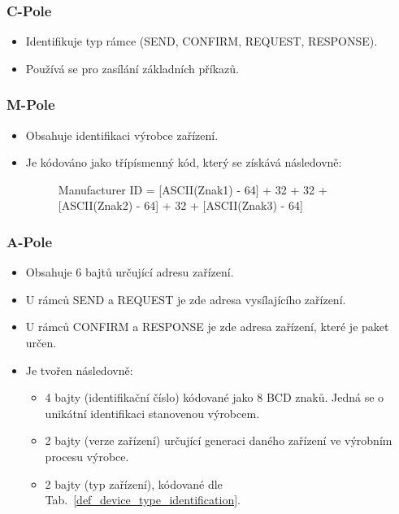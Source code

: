 \subsubsection{C-Pole}
\begin{itemize}
	\item Identifikuje typ rámce (SEND, CONFIRM, REQUEST, RESPONSE).
	\item Používá se pro zasílání základních příkazů.
\end{itemize}

\newpage

\subsubsection{M-Pole}
\begin{itemize}
	\item Obsahuje identifikaci výrobce zařízení.
	\item Je kódováno jako třípísmenný kód, který se získává následovně:
			\begin{figure}[!ht]
				\begin{centerverbatim}
				Manufacturer ID = [ASCII(Znak1) - 64] + 32 + 32
												+ [ASCII(Znak2) - 64] + 32
												+ [ASCII(Znak3) - 64]
				\end{centerverbatim}
			\end{figure}
\end{itemize}

\subsubsection{A-Pole}
\begin{itemize}
	\item Obsahuje 6 bajtů určující adresu zařízení.
	\item U rámců SEND a REQUEST je zde adresa vysílajícího zařízení.
	\item U rámců CONFIRM a RESPONSE je zde adresa zařízení, které je paket určen.
	\item Je tvořen následovně:
		\begin{itemize}
			\item 4 bajty (identifikační číslo) kódované jako 8 BCD znaků. Jedná se o unikátní identifikaci stanovenou výrobcem.
			\item 2 bajty (verze zařízení) určující generaci daného zařízení ve výrobním procesu výrobce.
			\item 2 bajty (typ zařízení), kódované dle Tab.~\ref{def_device_type_identification}.
		\end{itemize}
\end{itemize}

